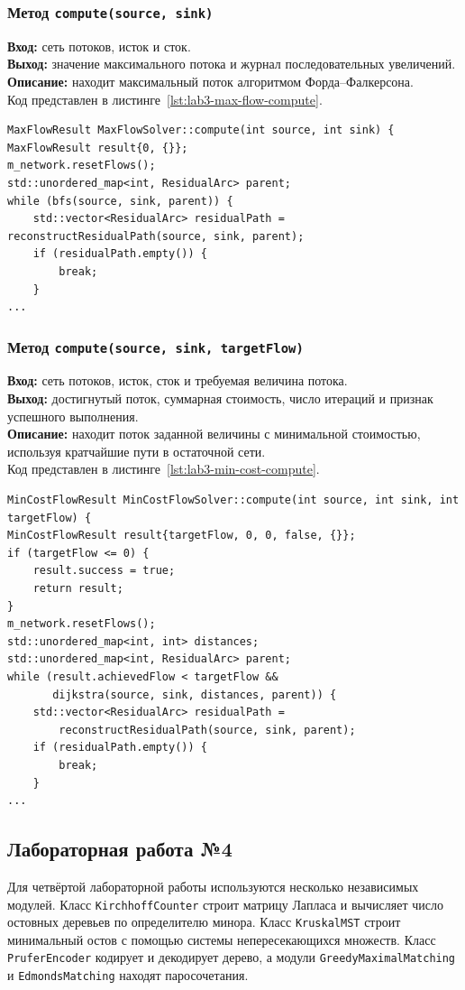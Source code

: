 \documentclass[14pt,a4paper]{extarticle}
\newcommand{\funcblock}[5]{%
\subsubsection*{Метод \code{#1}}
\noindent
\textbf{Вход:} #2\\
\textbf{Выход:} #3\\
\textbf{Описание:} #4\\
Код представлен в листинге~\ref{#5}.%
}
\newcommand{\code}[1]{\texttt{#1}}
\begin{document}
\funcblock
{compute(source, sink)}
{сеть потоков, исток и сток.}
{значение максимального потока и журнал последовательных увеличений.}
{находит максимальный поток алгоритмом Форда--Фалкерсона.}
{lst:lab3-max-flow-compute}
\begin{lstlisting}[style=cppcode,caption={Фрагмент функции \code{compute(source, sink)}},label={lst:lab3-max-flow-compute}]
MaxFlowResult MaxFlowSolver::compute(int source, int sink) {
MaxFlowResult result{0, {}};
m_network.resetFlows();
std::unordered_map<int, ResidualArc> parent;
while (bfs(source, sink, parent)) {
    std::vector<ResidualArc> residualPath = reconstructResidualPath(source, sink, parent);
    if (residualPath.empty()) {
        break;
    }
...
\end{lstlisting}

\funcblock
{compute(source, sink, targetFlow)}
{сеть потоков, исток, сток и требуемая величина потока.}
{достигнутый поток, суммарная стоимость, число итераций и признак успешного выполнения.}
{находит поток заданной величины с минимальной стоимостью, используя кратчайшие пути в остаточной сети.}
{lst:lab3-min-cost-compute}
\begin{lstlisting}[style=cppcode,caption={Фрагмент функции \code{compute(source, sink, targetFlow)}},label={lst:lab3-min-cost-compute}]
MinCostFlowResult MinCostFlowSolver::compute(int source, int sink, int targetFlow) {
MinCostFlowResult result{targetFlow, 0, 0, false, {}};
if (targetFlow <= 0) {
    result.success = true;
    return result;
}
m_network.resetFlows();
std::unordered_map<int, int> distances;
std::unordered_map<int, ResidualArc> parent;
while (result.achievedFlow < targetFlow &&
       dijkstra(source, sink, distances, parent)) {
    std::vector<ResidualArc> residualPath =
        reconstructResidualPath(source, sink, parent);
    if (residualPath.empty()) {
        break;
    }
...
\end{lstlisting}

\subsection{Лабораторная работа №4}

Для четвёртой лабораторной работы используются несколько независимых модулей. Класс \code{KirchhoffCounter} строит матрицу Лапласа и вычисляет число остовных деревьев по определителю минора. Класс \code{KruskalMST} строит минимальный остов с помощью системы непересекающихся множеств. Класс \code{PruferEncoder} кодирует и декодирует дерево, а модули \code{GreedyMaximalMatching} и \code{EdmondsMatching} находят паросочетания.
\end{document}

